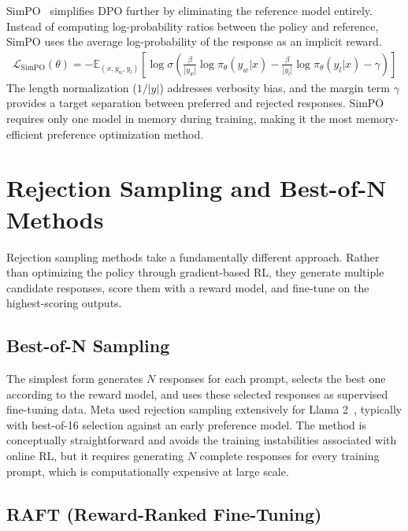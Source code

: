 \documentclass[12pt]{article}
\begin{document}
SimPO~\cite{Meng2024SimPO} simplifies DPO further by eliminating the reference model entirely. Instead of computing log-probability ratios between the policy and reference, SimPO uses the average log-probability of the response as an implicit reward.
\begin{align}
\mathcal{L}_{\text{SimPO}}(\theta) = -\mathbb{E}_{(x, y_w, y_l)} \left[ \log \sigma\!\left( \frac{\beta}{|y_w|} \log \pi_\theta(y_w|x) - \frac{\beta}{|y_l|} \log \pi_\theta(y_l|x) - \gamma \right) \right]
\end{align}
The length normalization ($1/|y|$) addresses verbosity bias, and the margin term $\gamma$ provides a target separation between preferred and rejected responses. SimPO requires only one model in memory during training, making it the most memory-efficient preference optimization method.


\section{Rejection Sampling and Best-of-N Methods}

Rejection sampling methods take a fundamentally different approach. Rather than optimizing the policy through gradient-based RL, they generate multiple candidate responses, score them with a reward model, and fine-tune on the highest-scoring outputs.

\subsection{Best-of-N Sampling}

The simplest form generates $N$ responses for each prompt, selects the best one according to the reward model, and uses these selected responses as supervised fine-tuning data. Meta used rejection sampling extensively for Llama 2~\cite{Touvron2023Llama2}, typically with best-of-16 selection against an early preference model. The method is conceptually straightforward and avoids the training instabilities associated with online RL, but it requires generating $N$ complete responses for every training prompt, which is computationally expensive at large scale.

\subsection{RAFT (Reward-Ranked Fine-Tuning)}
\end{document}
